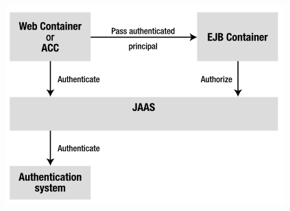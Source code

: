 \documentclass[12pt]{book}
\begin{document}
\begin{center}
\includegraphics[scale=0.6]{aut_aut}
\end{center}
\end{document}
